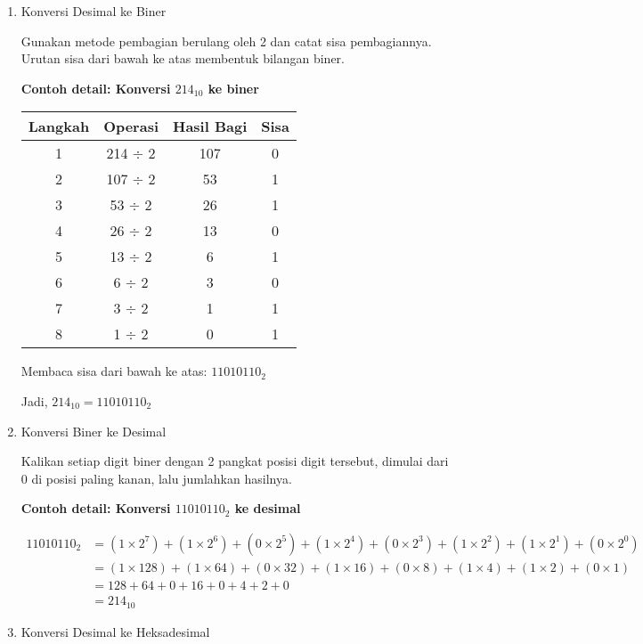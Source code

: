 \begin{enumerate}
\item{Konversi Desimal ke Biner}

Gunakan metode pembagian berulang oleh 2 dan catat sisa pembagiannya. Urutan sisa dari bawah ke atas membentuk bilangan biner.

\textbf{Contoh detail: Konversi \(214_{10}\) ke biner}

\begin{center}
\begin{tabular}{|c|c|c|c|}
\hline
\textbf{Langkah} & \textbf{Operasi} & \textbf{Hasil Bagi} & \textbf{Sisa} \\
\hline
1 & 214 $\div$ 2 & 107 & 0 \\
2 & 107 $\div$ 2 & 53 & 1 \\
3 & 53 $\div$ 2 & 26 & 1 \\
4 & 26 $\div$ 2 & 13 & 0 \\
5 & 13 $\div$ 2 & 6 & 1 \\
6 & 6 $\div$ 2 & 3 & 0 \\
7 & 3 $\div$ 2 & 1 & 1 \\
8 & 1 $\div$ 2 & 0 & 1 \\
\hline
\end{tabular}
\end{center}

Membaca sisa dari bawah ke atas: \(11010110_2\)

Jadi, \(214_{10} = 11010110_2\)

\item{Konversi Biner ke Desimal}

Kalikan setiap digit biner dengan 2 pangkat posisi digit tersebut, dimulai dari 0 di posisi paling kanan, lalu jumlahkan hasilnya.

\textbf{Contoh detail: Konversi \(11010110_2\) ke desimal}

\begin{align*}
11010110_2 &= (1 \times 2^7) + (1 \times 2^6) + (0 \times 2^5) + (1 \times 2^4) + (0 \times 2^3) + (1 \times 2^2) + (1 \times 2^1) + (0 \times 2^0) \\
&= (1 \times 128) + (1 \times 64) + (0 \times 32) + (1 \times 16) + (0 \times 8) + (1 \times 4) + (1 \times 2) + (0 \times 1) \\
&= 128 + 64 + 0 + 16 + 0 + 4 + 2 + 0 \\
&= 214_{10}
\end{align*}

\item{Konversi Desimal ke Heksadesimal}


\end{enumerate}

